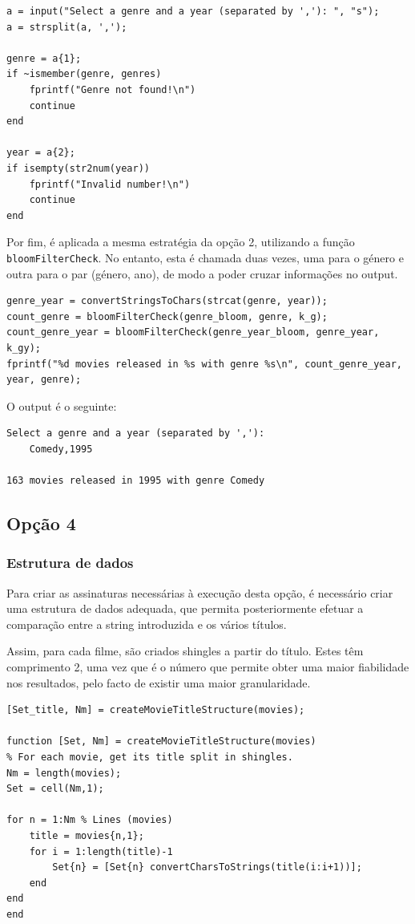 \documentclass[portuguese, 11pt, a4paper,titlepage, oneside]{article}
\begin{document}
\begin{lstlisting}[style=Matlab-editor]
a = input("Select a genre and a year (separated by ','): ", "s");
a = strsplit(a, ',');

genre = a{1};
if ~ismember(genre, genres)
    fprintf("Genre not found!\n")
    continue
end

year = a{2};
if isempty(str2num(year))
    fprintf("Invalid number!\n")
    continue
end
\end{lstlisting}

Por fim, é aplicada a mesma estratégia da opção 2, utilizando a função \verb|bloomFilterCheck|. No entanto, esta é chamada duas vezes, uma para o género e outra para o par (género, ano), de modo a poder cruzar informações no output.

\begin{lstlisting}[style=Matlab-editor]
genre_year = convertStringsToChars(strcat(genre, year));
count_genre = bloomFilterCheck(genre_bloom, genre, k_g);
count_genre_year = bloomFilterCheck(genre_year_bloom, genre_year, k_gy);
fprintf("%d movies released in %s with genre %s\n", count_genre_year, year, genre);
\end{lstlisting}

O output é o seguinte:

\begin{lstlisting}[style=Matlab-editor]
Select a genre and a year (separated by ','): 
    Comedy,1995

163 movies released in 1995 with genre Comedy
\end{lstlisting}


\subsection{Opção 4}
\subsubsection{Estrutura de dados} \label{4_structure}
Para criar as assinaturas necessárias à execução desta opção, é necessário criar uma estrutura de dados adequada, que permita posteriormente efetuar a comparação entre a string introduzida e os vários títulos.

Assim, para cada filme, são criados shingles a partir do título. Estes têm comprimento 2, uma vez que é o número que permite obter uma maior fiabilidade nos resultados, pelo facto de existir uma maior granularidade.

\begin{lstlisting}[style=Matlab-editor]
[Set_title, Nm] = createMovieTitleStructure(movies);

function [Set, Nm] = createMovieTitleStructure(movies)
% For each movie, get its title split in shingles.
Nm = length(movies);
Set = cell(Nm,1);

for n = 1:Nm % Lines (movies)
    title = movies{n,1};
    for i = 1:length(title)-1
        Set{n} = [Set{n} convertCharsToStrings(title(i:i+1))];
    end
end
end
\end{lstlisting}
\end{document}
